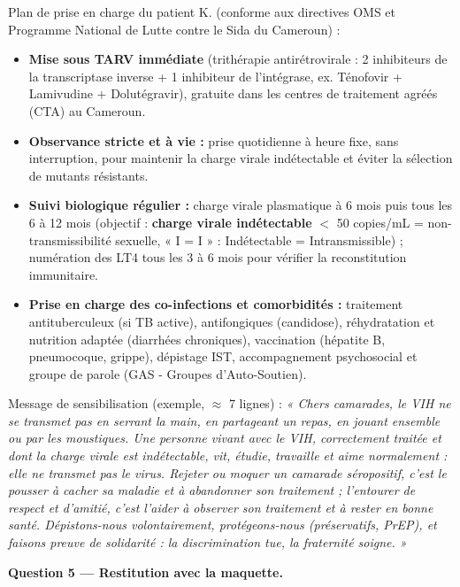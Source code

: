 \documentclass[11pt]{article}
\begin{document}
\begin{exoresolu}
Plan de prise en charge du patient K. (conforme aux directives OMS et Programme National de Lutte contre le Sida du Cameroun) :
\begin{itemize}
\item \textbf{Mise sous TARV immédiate} (trithérapie antirétrovirale : 2 inhibiteurs de la transcriptase inverse + 1 inhibiteur de l'intégrase, ex. Ténofovir + Lamivudine + Dolutégravir), gratuite dans les centres de traitement agréés (CTA) au Cameroun.
\item \textbf{Observance stricte et à vie :} prise quotidienne à heure fixe, sans interruption, pour maintenir la charge virale indétectable et éviter la sélection de mutants résistants.
\item \textbf{Suivi biologique régulier :} charge virale plasmatique à 6 mois puis tous les 6 à 12 mois (objectif : \textbf{charge virale indétectable} $<$ 50 copies/mL = non-transmissibilité sexuelle, « I = I » : Indétectable = Intransmissible) ; numération des LT4 tous les 3 à 6 mois pour vérifier la reconstitution immunitaire.
\item \textbf{Prise en charge des co-infections et comorbidités :} traitement antituberculeux (si TB active), antifongiques (candidose), réhydratation et nutrition adaptée (diarrhées chroniques), vaccination (hépatite B, pneumocoque, grippe), dépistage IST, accompagnement psychosocial et groupe de parole (GAS - Groupes d'Auto-Soutien).
\end{itemize}

Message de sensibilisation (exemple, $\approx$ 7 lignes) : 
\emph{« Chers camarades, le VIH ne se transmet pas en serrant la main, en partageant un repas, en jouant ensemble ou par les moustiques. Une personne vivant avec le VIH, correctement traitée et dont la charge virale est indétectable, vit, étudie, travaille et aime normalement : elle ne transmet pas le virus. Rejeter ou moquer un camarade séropositif, c'est le pousser à cacher sa maladie et à abandonner son traitement ; l'entourer de respect et d'amitié, c'est l'aider à observer son traitement et à rester en bonne santé. Dépistons-nous volontairement, protégeons-nous (préservatifs, PrEP), et faisons preuve de solidarité : la discrimination tue, la fraternité soigne. »}

\textbf{Question 5 — Restitution avec la maquette.}


\end{exoresolu}
\end{document}
